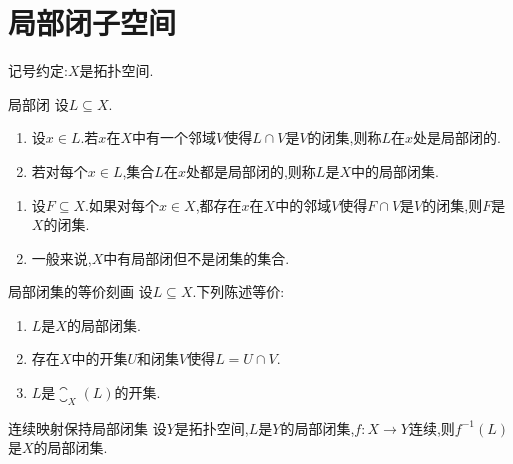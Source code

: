 \section{局部闭子空间}

记号约定:$X$是拓扑空间.

\begin{definition}{局部闭}{}
	设$L\subseteq X$.
	\begin{enumerate}
		\item 设$x\in L$.若$x$在$X$中有一个邻域$V$使得$L\cap V$是$V$的闭集,则称$L$在$x$处是局部闭的.
		\item 若对每个$x\in L$,集合$L$在$x$处都是局部闭的,则称$L$是$X$中的局部闭集.
	\end{enumerate}
\end{definition}

\begin{remark}{}{}
	\begin{enumerate}
		\item 设$F\subseteq X$.如果对每个$x\in X$,都存在$x$在$X$中的邻域$V$使得$F\cap V$是$V$的闭集,则$F$是$X$的闭集.
		\item 一般来说,$X$中有局部闭但不是闭集的集合.
	\end{enumerate}
\end{remark}

\begin{proposition}{局部闭集的等价刻画}{}
	设$L\subseteq X$.下列陈述等价:
	\begin{enumerate}
		\item $L$是$X$的局部闭集.
		\item 存在$X$中的开集$U$和闭集$V$使得$L=U\cap V$.
		\item $L$是$\closure_{X}\left(L\right)$的开集.
	\end{enumerate}
\end{proposition}

\begin{corollary}{连续映射保持局部闭集}{}
	设$Y$是拓扑空间,$L$是$Y$的局部闭集,$f:X\to Y$连续,则$f^{-1}\left(L\right)$是$X$的局部闭集.
\end{corollary}

























